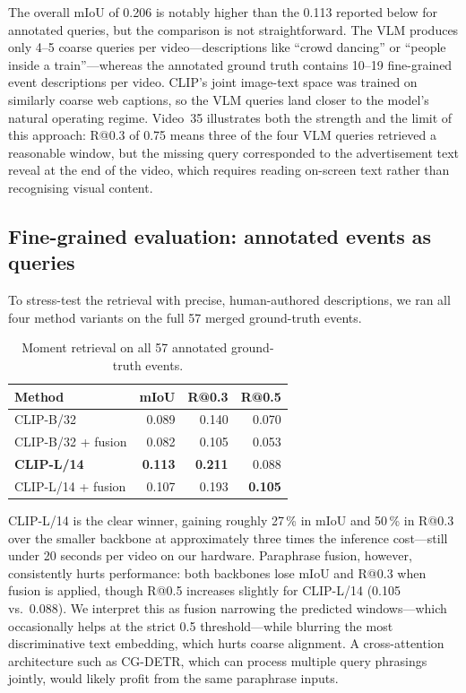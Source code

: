 \documentclass[sigconf, nonacm]{acmart}
\begin{document}
The overall mIoU of 0.206 is notably higher than the 0.113 reported below
for annotated queries, but the comparison is not straightforward. The VLM
produces only 4--5 coarse queries per video---descriptions like ``crowd
dancing'' or ``people inside a train''---whereas the annotated ground truth
contains 10--19 fine-grained event descriptions per video. CLIP's joint
image-text space was trained on similarly coarse web captions, so the VLM
queries land closer to the model's natural operating regime. Video~35
illustrates both the strength and the limit of this approach: R@0.3 of
0.75 means three of the four VLM queries retrieved a reasonable window, but
the missing query corresponded to the advertisement text reveal at the end
of the video, which requires reading on-screen text rather than recognising
visual content.

\subsection*{Fine-grained evaluation: annotated events as queries}

To stress-test the retrieval with precise, human-authored descriptions, we
ran all four method variants on the full 57 merged ground-truth events.

\begin{table}[h]
  \centering
  \caption{Moment retrieval on all 57 annotated ground-truth events.}
  \label{tab:mr}
  \begin{tabular}{lrrr}
    \toprule
    Method & mIoU & R@0.3 & R@0.5 \\
    \midrule
    CLIP-B/32            & 0.089 & 0.140 & 0.070 \\
    CLIP-B/32 + fusion   & 0.082 & 0.105 & 0.053 \\
    \textbf{CLIP-L/14}   & \textbf{0.113} & \textbf{0.211} & 0.088 \\
    CLIP-L/14 + fusion   & 0.107 & 0.193 & \textbf{0.105} \\
    \bottomrule
  \end{tabular}
\end{table}

CLIP-L/14 is the clear winner, gaining roughly 27\,\% in mIoU and 50\,\%
in R@0.3 over the smaller backbone at approximately three times the
inference cost---still under 20 seconds per video on our hardware.
Paraphrase fusion, however, consistently hurts performance: both backbones
lose mIoU and R@0.3 when fusion is applied, though R@0.5 increases
slightly for CLIP-L/14 (0.105 vs.\ 0.088). We interpret this as fusion
narrowing the predicted windows---which occasionally helps at the strict
0.5 threshold---while blurring the most discriminative text embedding,
which hurts coarse alignment. A cross-attention architecture such as
CG-DETR, which can process multiple query phrasings jointly, would likely
profit from the same paraphrase inputs.
\end{document}
